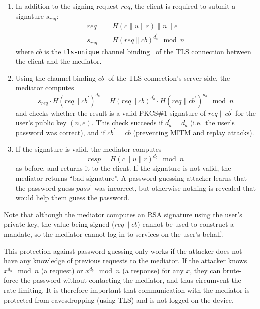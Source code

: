 \documentclass{llncs}
\newcommand*{\concat}{\mathbin{\|}}
\begin{document}
\begin{enumerate}
\item In addition to the signing request $\mathit{req}$, the client is required to submit a
signature $s_\mathit{req}$:
\begin{align}
    \mathit{req} &= H(c \concat u \concat r) \concat n \concat e \\
    s_\mathit{req} &= H(\mathit{req} \concat \mathit{cb})^{d_a^\prime} \mod n
\end{align}
where $\mathit{cb}$ is the \texttt{tls-unique} channel binding~\cite{ChannelBinding}
of the TLS connection between the client and the mediator.
\item Using the channel binding $\mathit{cb}^\prime$ of the TLS connection's server side, the
mediator computes
\begin{equation}
s_\mathit{req} \cdot H(\mathit{req} \concat \mathit{cb}^\prime)^{d_b} =
  H(\mathit{req} \concat \mathit{cb})^{d_a^\prime} \cdot
  H(\mathit{req} \concat \mathit{cb}^\prime)^{d_b} \mod n
\end{equation}
and checks whether the result is a valid PKCS\#1 signature of
$\mathit{req} \concat \mathit{cb}^\prime$ for the user's public key $(n, e)$. This check succeeds if
$d_a^\prime = d_a$ (i.e.\ the user's password was correct), and if $\mathit{cb}^\prime = \mathit{cb}$
(preventing MITM and replay attacks).
\item If the signature is valid, the mediator computes
\begin{equation}
\mathit{resp} = H(c \concat u \concat r)^{d_b} \mod n
\end{equation}
as before, and returns it to the client. If the signature is not valid, the mediator returns ``bad
signature''. A password-guessing attacker learns that the password guess $\mathit{pass}^\prime$ was
incorrect, but otherwise nothing is revealed that would help them guess the password.
\end{enumerate}

Note that although the mediator computes an RSA signature using the user's private key, the value
being signed ($\mathit{req} \concat \mathit{cb}$) cannot be used to construct a mandate, so the
mediator cannot log in to services on the user's behalf.

This protection against password guessing only works if the attacker does not have any knowledge of
previous requests to the mediator. If the attacker knows $x^{d_a} \mod n$ (a request) or
$x^{d_b} \mod n$ (a response) for any $x$, they can brute-force the password without contacting the
mediator, and thus circumvent the rate-limiting.  It is therefore important that communication with
the mediator is protected from eavesdropping (using TLS) and is not logged on the device.
\end{document}
